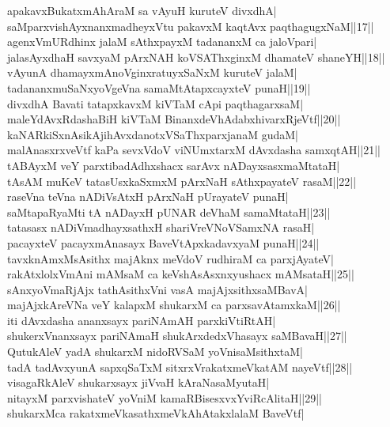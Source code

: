 \documentclass{article}
\begin{document}
apakavxBukatxmAhAraM sa vAyuH kuruteV divxdhA|\\
saMparxvishAyxnanxmadheyxVtu pakavxM kaqtAvx paqthagugxNaM||17||\\
agenxVmURdhinx jalaM sAthxpayxM tadananxM ca jaloVpari|\\
jalasAyxdhaH savxyaM pArxNAH koVSAThxginxM dhamateV shaneYH||18||\\
vAyunA dhamayxmAnoVginxratuyxSaNxM kuruteV jalaM|\\
tadananxmuSaNxyoVgeVna samaMtAtapxcayxteV punaH||19||\\
divxdhA Bavati tatapxkavxM kiVTaM cApi paqthagarxsaM|\\
maleYdAvxRdashaBiH kiVTaM BinanxdeVhAdabxhivarxRjeVtf||20||\\
kaNARkiSxnAsikAjihAvxdanotxVSaThxparxjanaM gudaM|\\
malAnasxrxveVtf kaPa sevxVdoV viNUmxtarxM dAvxdasha samxqtAH||21||\\
tABAyxM veY parxtibadAdhxshacx sarAvx nADayxsasxmaMtataH|\\
tAsAM muKeV tatasUsxkaSxmxM pArxNaH sAthxpayateV rasaM||22||\\
raseVna teVna nADiVsAtxH pArxNaH pUrayateV punaH|\\
saMtapaRyaMti tA nADayxH pUNAR deVhaM samaMtataH||23||\\
tatasasx nADiVmadhayxsathxH shariVreVNoVSamxNA rasaH|\\
pacayxteV pacayxmAnasayx BaveVtApxkadavxyaM punaH||24||\\
tavxknAmxMsAsithx majAknx meVdoV rudhiraM ca parxjAyateV|\\
rakAtxlolxVmAni mAMsaM ca keVshAsAsxnxyushacx mAMsataH||25||\\
sAnxyoVmaRjAjx tathAsithxVni vasA majAjxsithxsaMBavA|\\
majAjxkAreVNa veY kalapxM shukarxM ca parxsavAtamxkaM||26||\\
iti dAvxdasha ananxsayx pariNAmAH parxkiVtiRtAH|\\
shukerxVnanxsayx pariNAmaH shukArxdedxVhasayx saMBavaH||27||\\
QutukAleV yadA shukarxM nidoRVSaM yoVnisaMsithxtaM|\\
tadA tadAvxyunA sapxqSaTxM sitxrxVrakatxmeVkatAM nayeVtf||28||\\
visagaRkAleV shukarxsayx jiVvaH kAraNasaMyutaH|\\
nitayxM parxvishateV yoVniM kamaRBisesxvxYviRcAlitaH||29||\\
shukarxMca rakatxmeVkasathxmeVkAhAtakxlalaM BaveVtf|\\
\end{document}
